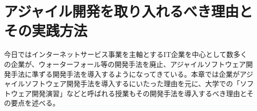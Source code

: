 \chapter{アジャイル開発を取り入れるべき理由とその実践方法}

今日ではインターネットサービス事業を主軸とするIT企業を中心として数多くの企業が、ウォーターフォール等の開発手法を廃止、アジャイルソフトウェア開発手法に準ずる開発手法を導入するようになってきている。本章では企業がアジャイルソフトウェア開発手法を導入するにいたった理由を元に、大学での「ソフトウェア開発演習」などと呼ばれる授業もその開発手法を導入するべき理由とその要点を述べる。



